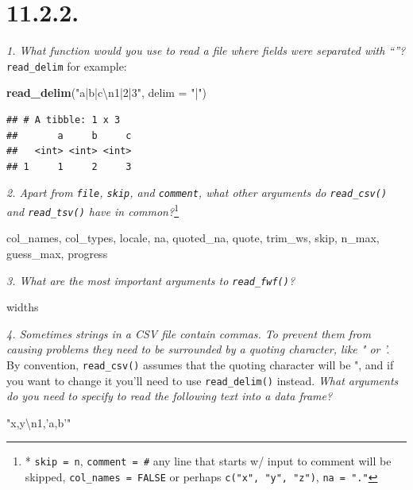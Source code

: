 \documentclass[]{book}
\newenvironment{Shaded}{\begin{snugshade}}{\end{snugshade}}
\newcommand{\CharTok}[1]{\textcolor[rgb]{0.31,0.60,0.02}{#1}}
\newcommand{\DataTypeTok}[1]{\textcolor[rgb]{0.13,0.29,0.53}{#1}}
\newcommand{\KeywordTok}[1]{\textcolor[rgb]{0.13,0.29,0.53}{\textbf{#1}}}
\newcommand{\NormalTok}[1]{#1}
\newcommand{\StringTok}[1]{\textcolor[rgb]{0.31,0.60,0.02}{#1}}
\let\rmarkdownfootnote\footnote%
\def\footnote{\protect\rmarkdownfootnote}
\theoremstyle{definition}
\theoremstyle{definition}
\theoremstyle{definition}
\theoremstyle{remark}
\begin{document}
\hypertarget{section-29}{%
\section{11.2.2.}\label{section-29}}

\emph{1. What function would you use to read a file where fields were
separated with ``\textbar{}''?}\\
\texttt{read\_delim} for example:

\begin{Shaded}
\begin{Highlighting}[]
\KeywordTok{read_delim}\NormalTok{(}\StringTok{"a|b|c}\CharTok{\textbackslash{}n}\StringTok{1|2|3"}\NormalTok{, }\DataTypeTok{delim =} \StringTok{"|"}\NormalTok{)}
\end{Highlighting}
\end{Shaded}

\begin{verbatim}
## # A tibble: 1 x 3
##       a     b     c
##   <int> <int> <int>
## 1     1     2     3
\end{verbatim}

\emph{2. Apart from \texttt{file}, \texttt{skip}, and \texttt{comment},
what other arguments do \texttt{read\_csv()} and \texttt{read\_tsv()}
have in common?}\footnote{* \texttt{skip\ =\ n}, \texttt{comment\ =\ \#}
  any line that starts w/ input to comment will be skipped,
  \texttt{col\_names\ =\ FALSE} or perhaps \texttt{c("x",\ "y",\ "z")},
  \texttt{na\ =\ "."}}

col\_names, col\_types, locale, na, quoted\_na, quote, trim\_ws, skip,
n\_max, guess\_max, progress

\emph{3. What are the most important arguments to \texttt{read\_fwf()}?}

widths

\emph{4. Sometimes strings in a CSV file contain commas. To prevent them
from causing problems they need to be surrounded by a quoting character,
like " or '.} By convention, \texttt{read\_csv()} assumes that the
quoting character will be ", and if you want to change it you'll need to
use \texttt{read\_delim()} instead. \emph{What arguments do you need to
specify to read the following text into a data frame?}

\begin{Shaded}
\begin{Highlighting}[]
\StringTok{"x,y}\CharTok{\textbackslash{}n}\StringTok{1,'a,b'"}
\end{Highlighting}
\end{Shaded}
\end{document}
